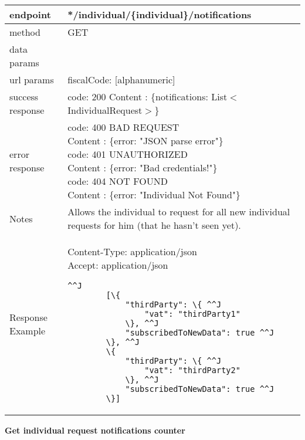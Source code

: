 	\begin{tabularx}{\linewidth}{| l| l }
		\hline
		endpoint & */individual/\{individual\}/notifications \\
		\hline
		method & GET \\
		\hline
		data params & \\
		\hline
		url params &
		\parbox{0.7\textwidth}{
			\bigskip
			fiscalCode: [alphanumeric]
			\bigskip
		} \\
		\hline
		success response &
		\parbox{0.7\textwidth}{
			\bigskip
			code: 200\\
			Content : \{notifications: List$<$IndividualRequest$>$\}
			\bigskip
		} \\
		\hline
		error response &
		\parbox{0.7\textwidth}{
			\bigskip
			code: 400 BAD REQUEST \\
			Content : \{error: "JSON parse error"\}\\
			code: 401 UNAUTHORIZED \\
			Content : \{error: "Bad credentials!"\}\\
			code: 404 NOT FOUND \\
			Content : \{error: "Individual Not Found"\}
			\bigskip
		} \\
		\hline
		Notes & 
		\parbox{0.7\textwidth}{
			\bigskip Allows the individual to request for all new individual requests for him (that he hasn't seen yet).
		\bigskip}  \\
		\hline
		Response Example & 
		\parbox{0.8\textwidth}{
		\bigskip
		Content-Type: application/json \\
		Accept: application/json \\
		\bigskip
		\begin{lstlisting}^^J
		[\{
			"thirdParty": \{ ^^J
				"vat": "thirdParty1"
			\}, ^^J
			"subscribedToNewData": true ^^J
		\}, ^^J
		\{
			"thirdParty": \{ ^^J
				"vat": "thirdParty2"
			\}, ^^J
			"subscribedToNewData": true ^^J
		\}]
	\end{lstlisting}
	} \\
	\hline
	\end{tabularx}
	
	\textbf{Get individual request notifications counter} \\

